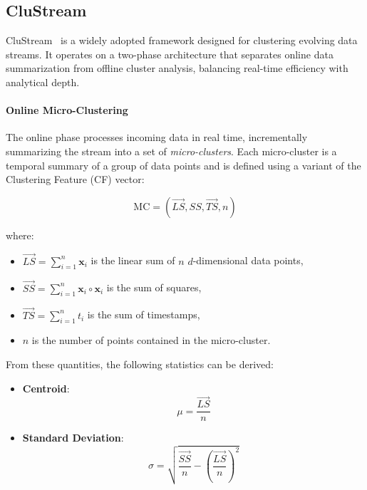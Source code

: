 \subsection{CluStream}\label{subsec:clustream}

CluStream~\cite{clustream} is a widely adopted framework designed for
clustering evolving data streams. It operates on a two-phase architecture that
separates online data summarization from offline cluster analysis, balancing
real-time efficiency with analytical depth.

\paragraph{Online Micro-Clustering} The online phase processes incoming data in real time, incrementally
summarizing the stream into a set of \textit{micro-clusters}. Each
micro-cluster is a temporal summary of a group of data points and is defined
using a variant of the Clustering Feature (CF) vector:

\begin{equation}
    \text{MC} = \left( \vec{LS}, SS, \vec{TS}, n \right)
\end{equation}

where:
\begin{itemize}
    \item $\vec{LS} = \sum_{i=1}^{n} \mathbf{x}_i$ is the linear sum of $n$ $d$-dimensional data points,
    \item $\vec{SS} = \sum_{i=1}^{n} \mathbf{x}_i \circ \mathbf{x}_i$ is the sum of squares,
    \item $\vec{TS} = \sum_{i=1}^{n} t_i$ is the sum of timestamps,
    \item $n$ is the number of points contained in the micro-cluster.
\end{itemize}

From these quantities, the following statistics can be derived:
\begin{itemize}
    \item \textbf{Centroid}:
          \begin{equation}
              \mu = \frac{\vec{LS}}{n}
          \end{equation}
    \item \textbf{Standard Deviation}:
          \begin{equation}
              \sigma = \sqrt{ \frac{\vec{SS}}{n} - \left( \frac{\vec{LS}}{n} \right)^2 }
          \end{equation}
\end{itemize}

